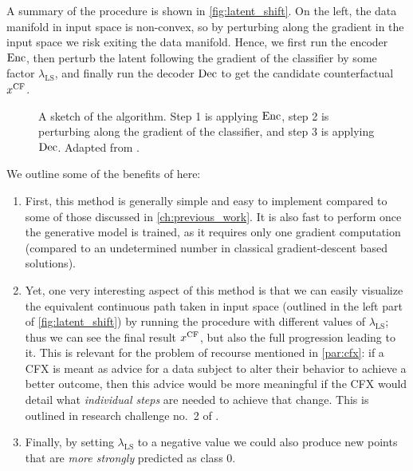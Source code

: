 \documentclass[../main.tex]{subfiles}
\begin{document}
A summary of the \ls{} procedure is shown in \autoref{fig:latent_shift}.
On the left, the data manifold in input space is non-convex, so by perturbing along the gradient in the input space we risk exiting the data manifold.
Hence, we first run the encoder $\operatorname{Enc}$, then perturb the latent following the gradient of the classifier by some factor $\lambda_\text{LS}$, and finally run the decoder $\operatorname{Dec}$ to get the candidate counterfactual $x^\mathrm{CF}$.

\begin{figure}[htbp]
	\centering
	
	\caption{A sketch of the \ls{} algorithm. Step 1 is applying $\operatorname{Enc}$, step 2 is perturbing along the gradient of the classifier, and step 3 is applying $\operatorname{Dec}$. Adapted from \cite{cohenGifsplanation2022}.}
	\label{fig:latent_shift}
\end{figure}

We outline some of the benefits of \ls{} here:

\begin{enumerate}
	\item First, this method is generally simple and easy to implement compared to some of those discussed in \autoref{ch:previous_work}.
	      It is also fast to perform once the generative model is trained, as it requires only one gradient computation (compared to an undetermined number in classical gradient-descent based solutions).

	\item Yet, one very interesting aspect of this method is that we can easily visualize the equivalent continuous path taken in input space (outlined in the left part of \autoref{fig:latent_shift}) by running the procedure with different values of $\lambda_\text{LS}$; thus we can see the final result $x^\mathrm{CF}$, but also the full progression leading to it.
	      This is relevant for the problem of recourse mentioned in \autoref{par:cfx}: if a CFX is meant as advice for a data subject to alter their behavior to achieve a better outcome, then this advice would be more meaningful if the CFX would detail what \emph{individual steps} are needed to achieve that change.
	      This is outlined in research challenge no.~2 of \cite{vermaCounterfactual2020}.

	\item Finally, by setting $\lambda_\text{LS}$ to a negative value we could also produce new points that are \emph{more strongly} predicted as class 0.
\end{enumerate}
\end{document}
